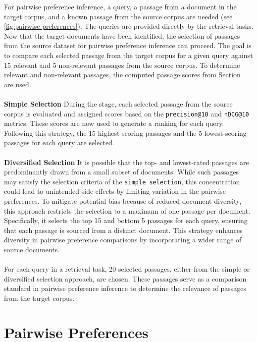 For pairwise preference inference, a query, a passage from a document in the target corpus, and a known passage from the source corpus are needed (see \ref{fig:pairwise-preferences}). The queries are provided directly by the retrieval tasks. Now that the target documents have been identified, the selection of passages from the source dataset for pairwise preference inference can proceed. The goal is to compare each selected passage from the target corpus for a given query against 15 relevant and 5 non-relevant passages from the source corpus. To determine relevant and non-relevant passages, the computed passage scores from Section~ are used.
\\\\
\textbf{Simple Selection} During the  stage, each selected passage from the source corpus is evaluated and assigned scores based on the \texttt{precision@10} and \texttt{nDCG@10} metrics. These scores are now used to generate a ranking for each query. Following this strategy, the 15 highest-scoring passages and the 5 lowest-scoring passages for each query are selected.
\\\\
\textbf{Diversified Selection} It is possible that the top- and lowest-rated passages are predominantly drawn from a small subset of documents. While such passages may satisfy the selection criteria of the \texttt{simple selection}, this concentration could lead to unintended side effects by limiting variation in the pairwise preferences. To mitigate potential bias because of reduced document diversity, this approach restricts the selection to a maximum of one passage per document. Specifically, it selects the top 15 and bottom 5 passages for each query, ensuring that each passage is sourced from a distinct document. This strategy enhances diversity in pairwise preference comparisons by incorporating a wider range of source documents.
\\\\
For each query in a retrieval task, 20 selected passages, either from the simple or diversified selection approach, are chosen. These passages serve as a comparison standard in pairwise preference inference to determine the relevance of passages from the target corpus.


\section{Pairwise Preferences}\label{pairwise-transfering-relevance-labels-across-datasets}

